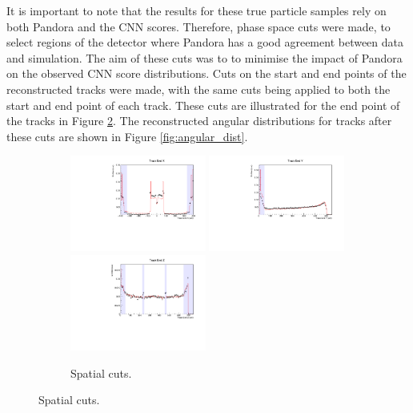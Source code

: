 It is important to note that the results for these true particle 
samples rely on both Pandora and the CNN scores. Therefore, phase space cuts 
were made, to select regions of the detector where Pandora has a good 
agreement between data and simulation. The aim of these cuts was to to 
minimise the impact of Pandora on the observed CNN score distributions. Cuts 
on the start and end points of the reconstructed tracks were made, with the 
same cuts being applied to both the start and end point of each track. These 
cuts are illustrated for the end point of the tracks in Figure 
\ref{fig:spatial_cuts}.  The reconstructed angular distributions for tracks 
after these cuts are shown in Figure \ref{fig:angular_dist}.

\begin{figure}

	\begin{subfigure}[b]{\textwidth}
		\centering
		\includegraphics[width=0.49\textwidth]{figures/endX_nocuts.pdf}
		\hfill
		\includegraphics[width=0.49\textwidth]{figures/endY_nocuts.pdf}
		\includegraphics[width=0.49\textwidth]{figures/endZ_nocuts.pdf}
		\caption {Spatial cuts.}
		\label{fig:spatial_cuts}
	\end{subfigure}


\end{figure}

